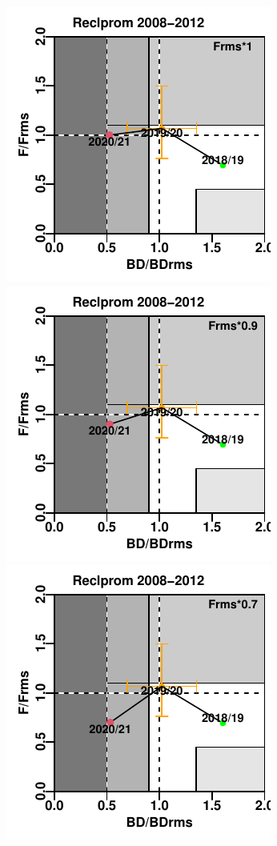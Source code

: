 \documentclass[
  spanish,
]{article}
\begin{document}
\includegraphics{FigurasInforme_Marzo/Fig44b_sept-1.pdf}
\includegraphics{FigurasInforme_Marzo/Fig44b_sept-2.pdf}
\includegraphics{FigurasInforme_Marzo/Fig44b_sept-3.pdf}
\end{document}

